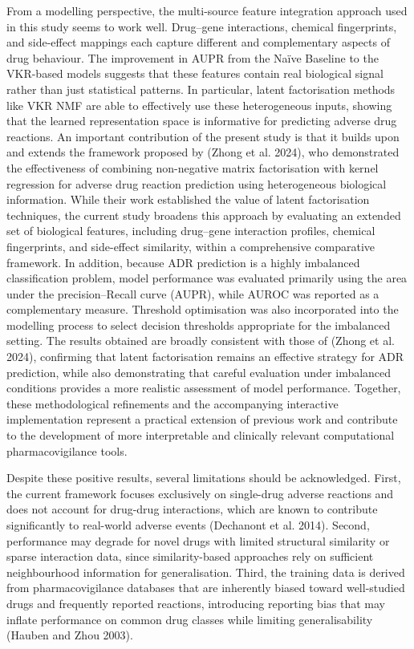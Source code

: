 \documentclass{article}
\begin{document}
From a modelling perspective, the multi-source feature integration
approach used in this study seems to work well. Drug--gene interactions,
chemical fingerprints, and side-effect mappings each capture different
and complementary aspects of drug behaviour. The improvement in AUPR
from the Naïve Baseline to the VKR-based models suggests that these
features contain real biological signal rather than just statistical
patterns. In particular, latent factorisation methods like VKR NMF are
able to effectively use these heterogeneous inputs, showing that the
learned representation space is informative for predicting adverse drug
reactions. An important contribution of the present study is that it
builds upon and extends the framework proposed by (Zhong et al. 2024),
who demonstrated the effectiveness of combining non-negative matrix
factorisation with kernel regression for adverse drug reaction
prediction using heterogeneous biological information. While their work
established the value of latent factorisation techniques, the current
study broadens this approach by evaluating an extended set of biological
features, including drug--gene interaction profiles, chemical
fingerprints, and side-effect similarity, within a comprehensive
comparative framework. In addition, because ADR prediction is a highly
imbalanced classification problem, model performance was evaluated
primarily using the area under the precision--Recall curve (AUPR), while
AUROC was reported as a complementary measure. Threshold optimisation
was also incorporated into the modelling process to select decision
thresholds appropriate for the imbalanced setting. The results obtained
are broadly consistent with those of (Zhong et al. 2024), confirming
that latent factorisation remains an effective strategy for ADR
prediction, while also demonstrating that careful evaluation under
imbalanced conditions provides a more realistic assessment of model
performance. Together, these methodological refinements and the
accompanying interactive implementation represent a practical extension
of previous work and contribute to the development of more interpretable
and clinically relevant computational pharmacovigilance tools.

Despite these positive results, several limitations should be
acknowledged. First, the current framework focuses exclusively on
single-drug adverse reactions and does not account for drug-drug
interactions, which are known to contribute significantly to real-world
adverse events (Dechanont et al. 2014). Second, performance may degrade
for novel drugs with limited structural similarity or sparse interaction
data, since similarity-based approaches rely on sufficient neighbourhood
information for generalisation. Third, the training data is derived from
pharmacovigilance databases that are inherently biased toward
well-studied drugs and frequently reported reactions, introducing
reporting bias that may inflate performance on common drug classes while
limiting generalisability (Hauben and Zhou 2003).
\end{document}
